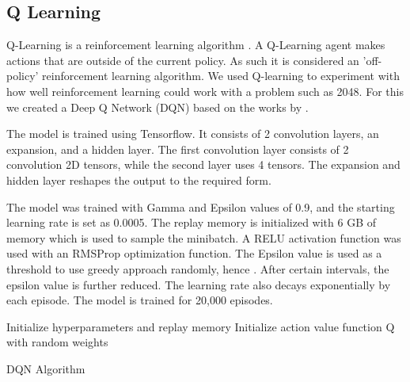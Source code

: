 \documentclass{svproc}
\begin{document}
    \subsection{Q Learning}

    Q-Learning is a reinforcement learning algorithm \cite{watkins1992q}. A Q-Learning agent makes actions that are outside of the current policy. As such it is considered an 'off-policy' reinforcement learning algorithm. We used Q-learning to experiment with how well reinforcement learning could work with a problem such as 2048. For this we created a Deep Q Network (DQN) based on the works by \cite{dqnGit}.

    The model is trained using Tensorflow. It consists of 2 convolution layers, an expansion, and a hidden layer. The first convolution layer consists of 2 convolution 2D tensors, while the second layer uses 4 tensors. The expansion and hidden layer reshapes the output to the required form.

    The model was trained with Gamma and Epsilon values of 0.9, and the starting learning rate is set as 0.0005. The replay memory is initialized with 6 GB of memory which is used to sample the minibatch. A RELU activation function was used with an RMSProp optimization function. The Epsilon value is used as a threshold to use greedy approach randomly, hence . After certain intervals, the epsilon value is further reduced. The learning rate also decays exponentially by each episode. The model is trained for 20,000 episodes.

    \begin{algorithm}[h!]
        \SetAlgoLined
        Initialize hyperparameters and replay memory\;
        Initialize action value function Q with random weights\;
        \caption{DQN Algorithm}
    \end{algorithm}
\end{document}
